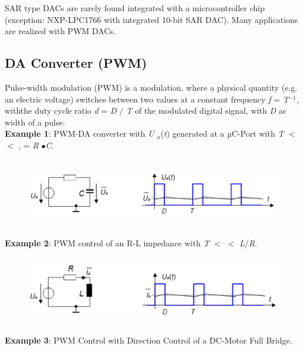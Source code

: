 SAR type DACs are rarely found integrated with a microcontroller chip (exception: NXP-LPC1766 with integrated 10-bit SAR DAC). Many applications are realized with PWM DACs.
\newpage

\subsection{DA Converter (PWM)}

Pulse-width modulation (PWM) is a modulation, where a physical quantity (e.g. an electric voltage) switches between two values at a constant frequency \textit{f}  = \textit{T}${}^{-1}$, withthe duty cycle ratio \textit{d} = \textit{D} / \textit{T} of the modulated digital signal, with \textit{D} as width of a pulse.\\

\textbf{Example 1}:  PWM-DA converter with \textit{U ${}_{a}$}(\textit{t}) generated at a µC-Port with \textit{T} $\mathrm{<}$ $\mathrm{<}$ ,  = \textit{R} $\mathrm{\bullet}$\textit{C}.

    \begin{figure}[h]
    \centering
    \includegraphics[width=12cm, height=3cm]{Images/image167.png}
    \label{fig:Fig 121}
    \end{figure}

\textbf{Example 2}:  PWM control of an R-L impedance with \textit{T} $\mathrm{<}$ $\mathrm{<}$ \textit{L}/\textit{R}.

    \begin{figure}[h]
    \centering
    \includegraphics[width=12cm, height=3cm]{Images/image168.png}
    \label{fig:Fig 122}
    \end{figure}

\textbf{Example 3}:  PWM Control with Direction Control of a DC-Motor  Full Bridge.

